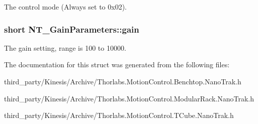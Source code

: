 The control mode (Always set to 0x02). 

\subsubsection[{\texorpdfstring{gain}{gain}}]{\setlength{\rightskip}{0pt plus 5cm}short N\+T\+\_\+\+Gain\+Parameters\+::gain}\hypertarget{struct_n_t___gain_parameters_a498c084c73b88ed17b08114bb36f72b7}{}\label{struct_n_t___gain_parameters_a498c084c73b88ed17b08114bb36f72b7}


The gain setting, range is 100 to 10000. 



The documentation for this struct was generated from the following files\+:\begin{DoxyCompactItemize}
\item 
third\+\_\+party/\+Kinesis/\+Archive/Thorlabs.\+Motion\+Control.\+Benchtop.\+Nano\+Trak.\+h\item 
third\+\_\+party/\+Kinesis/\+Archive/Thorlabs.\+Motion\+Control.\+Modular\+Rack.\+Nano\+Trak.\+h\item 
third\+\_\+party/\+Kinesis/\+Archive/Thorlabs.\+Motion\+Control.\+T\+Cube.\+Nano\+Trak.\+h\end{DoxyCompactItemize}
